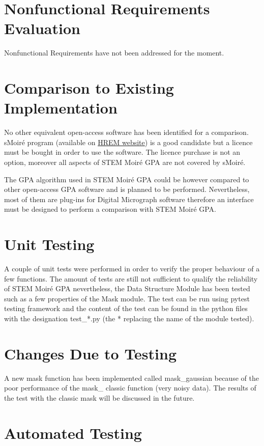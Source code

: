 \documentclass[12pt, titlepage]{article}
\newcommand{\progname}{STEM Moir{\'e} GPA}
\begin{document}
\section{Nonfunctional Requirements Evaluation}

Nonfunctional Requirements have not been addressed for the moment.
	
\section{Comparison to Existing Implementation}	

No other equivalent open-access software has been identified for a comparison. 
sMoir{\'e} program (available on \href{https://www.hremresearch.com/}{HREM 
website}) is a good candidate but a licence must be bought in order to use the 
software. The licence purchase is not an option, moreover all aspects of 
\progname{} are not covered by sMoir{\'e}.

The GPA algorithm used in \progname{} could be however compared to other 
open-access GPA software and is planned to be performed. Nevertheless, most of 
them are plug-ins for Digital Micrograph software therefore an interface must be 
designed to perform a comparison with \progname{}. 

\section{Unit Testing}

A couple of unit tests were performed in order to verify the proper behaviour of 
a few functions. The amount of tests are still not sufficient to qualify the 
reliability of \progname{} nevertheless, the Data Structure Module has been 
tested such as a few properties of the Mask module. The test can be run using 
pytest testing framework and the content of the test can be found in the python 
files with the designation test{\_}*.py (the * replacing the name of the module 
tested).

\section{Changes Due to Testing}

A new mask function has been implemented called mask{\_}gaussian because of the 
poor performance of the mask{\_} classic function (very noisy data). The results 
of the test with the classic mask will be discussed in the future.

\section{Automated Testing}
\end{document}
